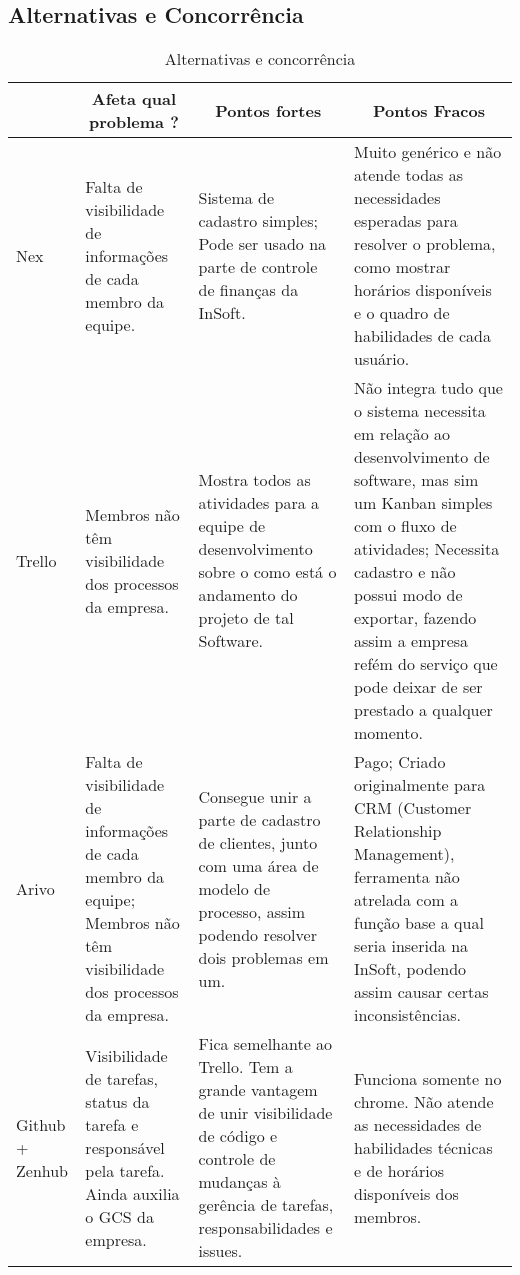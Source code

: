    \subsection{Alternativas e Concorrência}
       \label{subsec:Concorrentes}
      \begin{table}[H]
        \centering
        \begin{tabular}{|p{}|p{}|p{}|p{}|}
          \hline
          \rowcolor[HTML]{C0C0C0}
          \multicolumn{1}{c}{Produto} & \multicolumn{1}{|c|}{Afeta qual problema ?} & \multicolumn{1}{|c|}{Pontos fortes} & \multicolumn{1}{|c|}{Pontos Fracos} \\ \hline
            Nex
              & Falta de visibilidade de informações de cada membro da equipe.
              & Sistema de cadastro simples;
                Pode ser usado na parte de controle de finanças da InSoft.
              & Muito genérico e não atende todas as necessidades esperadas para resolver o problema, como mostrar horários disponíveis e o quadro de habilidades de cada usuário. \\ \hline
            Trello
              & Membros não têm visibilidade dos processos da empresa.
              & Mostra todos as atividades para a equipe de desenvolvimento sobre o como está o andamento do projeto de tal Software.
              & Não integra tudo que o sistema necessita em relação ao desenvolvimento de software, mas sim um Kanban simples com o fluxo de atividades;
                Necessita cadastro e não possui modo de exportar, fazendo assim a empresa refém do serviço que pode deixar de ser prestado a qualquer momento. \\ \hline
            Arivo
              & Falta de visibilidade de informações de cada membro da equipe;
                Membros não têm visibilidade dos processos da empresa.
              & Consegue unir a parte de cadastro de clientes, junto com uma área de modelo de processo, assim podendo resolver dois problemas em um.
              & Pago;
                Criado originalmente para CRM (Customer Relationship Management), ferramenta não atrelada com a função base a qual seria inserida na InSoft, podendo assim causar certas inconsistências. \\ \hline
            Github
            +
            Zenhub
              & Visibilidade de tarefas, status da tarefa e responsável pela 
                tarefa. Ainda auxilia o GCS da empresa.
              & Fica semelhante ao Trello. Tem a grande vantagem de unir 
                visibilidade de código e controle de mudanças à gerência de 
                tarefas, responsabilidades e issues.
              & Funciona somente no chrome. Não atende as necessidades de 
                habilidades técnicas e de horários disponíveis dos membros. \\ \hline
        \end{tabular}
        \caption{Alternativas e concorrência}
      \end{table}

